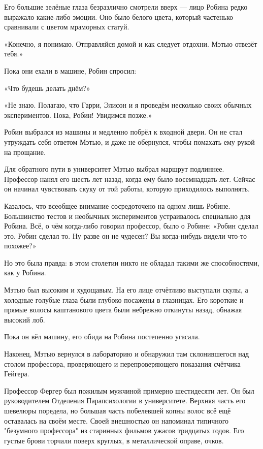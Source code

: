 \documentclass[a4paper,12pt]{book}
\begin{document}
\par
Его большие зелёные глаза безразлично смотрели вверх — лицо Робина редко выражало какие-либо эмоции. Оно было белого цвета, который частенько сравнивали с цветом мраморных статуй.
\par
«Конечно, я понимаю. Отправляйся домой и как следует отдохни. Мэтью отвезёт тебя.»\\
\par
Пока они ехали в машине, Робин спросил:
\par
«Что будешь делать днём?»
\par
«Не знаю. Полагаю, что Гарри, Элисон и я проведём несколько своих обычных экспериментов. Пока, Робин! Увидимся позже.»
\par
Робин выбрался из машины и медленно побрёл к входной двери. Он не стал утруждать себя ответом Мэтью, и даже не обернулся, чтобы помахать ему рукой на прощание.\\
\par
Для обратного пути в университет Мэтью выбрал маршрут подлиннее. Профессор нанял его шесть лет назад, когда ему было восемнадцать лет. Сейчас он начинал чувствовать скуку от той работы, которую приходилось выполнять.
\par
Казалось, что всеобщее внимание сосредоточено на одном лишь Робине. Большинство тестов и необычных экспериментов устраивалось специально для Робина. Всё, о чём когда-либо говорил профессор, было о Робине: «Робин сделал это. Робин сделал то. Ну разве он не чудесен? Вы когда-нибудь видели что-то похожее?»
\par
Но это была правда: в этом столетии никто не обладал такими же способностями, как у Робина.\\
\par
Мэтью был высоким и худощавым. На его лице отчётливо выступали скулы, а холодные голубые глаза были глубоко посажены в глазницах. Его короткие и прямые волосы каштанового цвета были небрежно откинуты назад, обнажая высокий лоб.
\par
Пока он вёл машину, его обида на Робина постепенно угасала.\\
\par
Наконец, Мэтью вернулся в лабораторию и обнаружил там склонившегося над столом профессора, проверяющего и перепроверяющего показания счётчика Гейгера.
\par
Профессор Фергер был пожилым мужчиной примерно шестидесяти лет. Он был руководителем Отделения Парапсихологии в университете. Верхняя часть его шевелюры поредела, но большая часть побелевшей копны волос всё ещё оставалась на своём месте. Своей внешностью он напоминал типичного "безумного профессора" из старинных фильмов ужасов тридцатых годов. Его густые брови торчали поверх круглых, в металлической оправе, очков.
\end{document}
